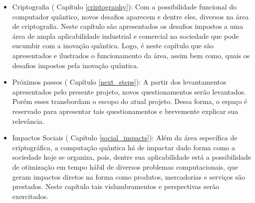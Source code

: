 \begin{itemize}
  \item Criptografia ( Capítulo \ref{criptography}): Com a possibilidade funcional do computador quântico, novos desafios aparecem e dentre eles, diversos na área de criptografia. Neste capítulo são apresentados os desafios impostos a uma área de ampla aplicabilidade industrial e comercial na sociedade que pode sucumbir com a inovação quântica. Logo, é neste capítulo que são apresentados e ilustrados o funcionamento da área, assim bem como, quais os desafios impostos pela inovação quântica.
  \item Próximos passos ( Capítulo \ref{next_steps}): A partir dos levantamentos apresentados pelo presente projeto, novos questionamentos serão levantados. Porém esses transbordam o escopo do atual projeto. Dessa forma, o espaço é reservado para apresentar tais questionamentos e brevemente explicar sua relevância.
  \item Impactos Sociais ( Capítulo \ref{social_impacts}): Além da área específica de criptográfica, a computação quântica há de impactar dado forma como a sociedade hoje se organiza, pois, dentre sua aplicabilidade está a possibilidade de otimização em tempo hábil de diversos problemas computacionais, que geram impactos diretos na forma como produtos, mercadorias e serviços são prestados. Neste capítulo tais vislumbramentos e perspectivas serão exercitados.
\end{itemize}

\newpage

